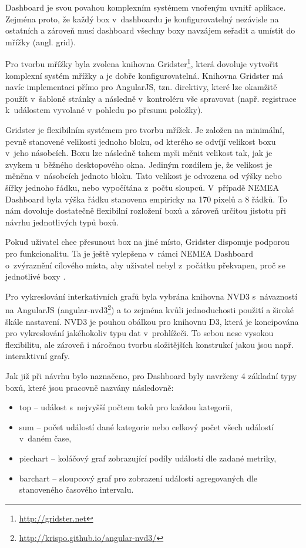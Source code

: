 Dashboard je svou povahou komplexním systémem vnořeným uvnitř aplikace. Zejména proto, že každý box v~dashboardu je konfigurovatelný nezávisle na ostatních a zároveň musí dashboard všechny boxy navzájem seřadit a umístit do mřížky (angl. grid).

Pro tvorbu mřížky byla zvolena knihovna Gridster\footnote{\url{http://gridster.net}}, která dovoluje vytvořit komplexní systém mřížky a je dobře konfigurovatelná. Knihovna Gridster má navíc implementaci přímo pro AngularJS, tzn. direktivy, které lze okamžitě použít v~šabloně stránky a následně v~kontroléru vše spravovat (např. registrace k~událostem vyvolané v~pohledu po přesunu položky).

Gridster je flexibilním systémem pro tvorbu mřížek. Je založen na minimální, pevně stanovené velikosti jednoho bloku, od kterého se odvíjí velikost boxu v~jeho násobcích. Boxu lze následně tahem myši měnit velikost tak, jak je zvykem u~běžného desktopového okna. Jediným rozdílem je, že velikost je měněna v~násobcích jednoto bloku. Tato velikost je odvozena od výšky nebo šířky jednoho řádku, nebo vypočítána z~počtu sloupců. V~případě NEMEA Dashboard byla výška řádku stanovena empiricky na 170 pixelů a 8 řádků. To nám dovoluje dostatečně flexibilní rozložení boxů a zároveň určitou jistotu při návrhu jednotlivých typů boxů.

Pokud uživatel chce přesunout box na jiné místo, Gridster disponuje podporou pro  funkcionalitu. Ta je ještě vylepšena v~rámci NEMEA Dashboard o~zvýraznění cílového místa, aby uživatel nebyl z~počátku překvapen, proč se jednotlivé boxy .

Pro vykreslování interkativních grafů byla vybrána knihovna NVD3 s~návazností na AngularJS (angular-nvd3\footnote{\url{http://krispo.github.io/angular-nvd3/}}) a to zejména kvůli jednoduchosti použití a široké škále nastavení. NVD3 je pouhou obálkou pro knihovnu D3, která je koncipována pro vykreslování jakéhokoliv typu dat v~prohlížeči. To sebou nese vysokou flexibilitu, ale zároveň i náročnou tvorbu složitějších konstrukcí jakou jsou např. interaktivní grafy.

Jak již při návrhu bylo naznačeno, pro Dashboard byly navrženy 4 základní typy boxů, které jsou pracovně nazvány následovně:

\begin{itemize}
    \item top -- událost s~nejvyšší počtem toků pro každou kategorii,
    \item sum -- počet událostí dané kategorie nebo celkový počet všech událostí v~daném čase,
    \item piechart -- koláčový graf zobrazující podíly událostí dle zadané metriky,
    \item barchart -- sloupcový graf pro zobrazení událostí agregovaných dle stanoveného časového intervalu.
\end{itemize}

